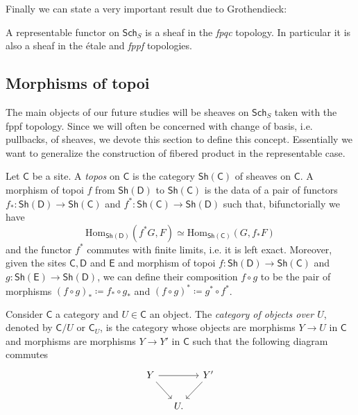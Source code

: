\noindent
Finally we can state a very important result due to Grothendieck:
\begin{thm}\label{thm:reprFctSheaf}
	A representable functor on $\mathsf{Sch}_{ S }$ is a sheaf in the {\em fpqc} topology.
	In particular it is also a sheaf in the étale and {\em fppf} topologies.
\end{thm}



\subsection{Morphisms of topoi}
The main objects of our future studies will be sheaves on
$\mathsf{Sch}_{ S }$ taken with the fppf topology.
Since we will often be concerned with change of basis, i.e. pullbacks,
of sheaves, we devote this section to define this concept.
Essentially we want to generalize the construction
of fibered product in the representable case.


\begin{defn}[Topoi]
	Let $\mathsf{C}$ be a site.
	A {\em topos} on $\mathsf{C}$ is the category $\mathsf{Sh}\left(\mathsf{C}\right)$
	of sheaves on $\mathsf{C}$.
	A morphism of topoi $f$ from $\mathsf{Sh}\left(\mathsf{D}\right)$
	to $\mathsf{Sh}\left(\mathsf{C}\right)$ is the data of a pair
	of functors $f_*\colon \mathsf{Sh}\left(\mathsf{D}\right) \to \mathsf{Sh}\left(\mathsf{C}\right)$
	and $f^*\colon \mathsf{Sh}\left(\mathsf{C}\right) \to \mathsf{Sh}\left(\mathsf{D}\right)$
	such that, bifunctorially we have
	\begin{equation*}
		\mathrm{Hom}_{\mathsf{Sh}(\mathsf{D})} \left( f^*G, F \right) \simeq
		\mathrm{Hom}_{\mathsf{Sh}(\mathsf{C})} \left( G, f_*F \right) 
	\end{equation*}
	and the functor $f^*$ commutes with finite limits, i.e. it
	is left exact.
	Moreover, given the sites $\mathsf{C}, \mathsf{D}$ and $\mathsf{E}$
	and morphism of topoi 
	$f\colon \mathsf{Sh}\left(\mathsf{D}\right) \to \mathsf{Sh}\left(\mathsf{C}\right)$ and
	$g\colon \mathsf{Sh}\left(\mathsf{E}\right) \to \mathsf{Sh}\left(\mathsf{D}\right)$,
	we can define their composition $f \circ g$
	to be the pair of morphisms $\left( f \circ g \right)_* \coloneqq f_* \circ g_*$
	and $\left( f \circ g \right)^* \coloneqq g^* \circ f^*$.
\end{defn}


\begin{defn}
	Consider $\mathsf{C}$ a category and $U \in \mathsf{C}$ an object.
	The {\em category of objects over $U$}, denoted by $\mathsf{C}/U$
	or $\mathsf{C}_U$, is the category whose objects are morphisms
	$Y \to U$ in $\mathsf{C}$ and morphisms are morphisms $Y \to Y'$
	in $\mathsf{C}$ such that the following diagram commutes
	\begin{equation*}
	\begin{tikzcd}[column sep=1.2em]
		Y \arrow[rr, "", rightarrow] 
		\arrow[rd, "", rightarrow] & &
		Y' \arrow[ld, "", rightarrow] \\
		&
		U
	.\end{tikzcd}
	\end{equation*}
\end{defn}


